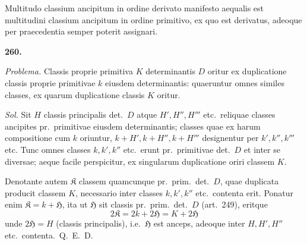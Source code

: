 \documentclass[12pt,a4paper]{article}
\theoremstyle{plain}
\theoremstyle{definition}
\theoremstyle{remark}
\begin{document}
Multitudo classium ancipitum in ordine derivato manifesto aequalis est multitudini classium ancipitum in ordine primitivo, ex quo est derivatus, adeoque per praecedentia semper poterit assignari.

\begin{center}\textbf{260.}\end{center}

\textit{Problema.} Classis proprie primitiva $K$ determinantis $D$ oritur ex duplicatione classis proprie primitivae $k$ eiusdem determinantis: quaeruntur omnes similes classes, ex quarum duplicatione classis $K$ oritur.

\textit{Sol.} Sit $H$ classis principalis det.\ $D$ atque $H', H'', H'''$ etc.\ reliquae classes ancipites pr.\ primitivae eiusdem determinantis; classes quae ex harum compositione cum $k$ oriuntur, $k + H', k + H'', k + H'''$ designentur per $k', k'', k'''$ etc. Tunc omnes classes $k, k', k''$ etc.\ erunt pr.\ primitivae det.\ $D$ et inter se diversae; aeque facile perspicitur, ex singularum duplicatione oriri classem $K$.

Denotante autem $\mathfrak{K}$ classem quamcunque pr.\ prim.\ det.\ $D$, quae duplicata producit classem $K$, necessario inter classes $k, k', k''$ etc.\ contenta erit. Ponatur enim $\mathfrak{K} = k + \mathfrak{H}$, ita ut $\mathfrak{H}$ sit classis pr.\ prim.\ det.\ $D$ (art.\ 249), eritque
\[
2\mathfrak{K} = 2k + 2\mathfrak{H} = K + 2\mathfrak{H}
\]
unde $2\mathfrak{H} = H$ (classis principalis), i.e.\ $\mathfrak{H}$ est anceps, adeoque inter $H, H', H''$ etc.\ contenta.\ Q.\ E.\ D.
\end{document}
